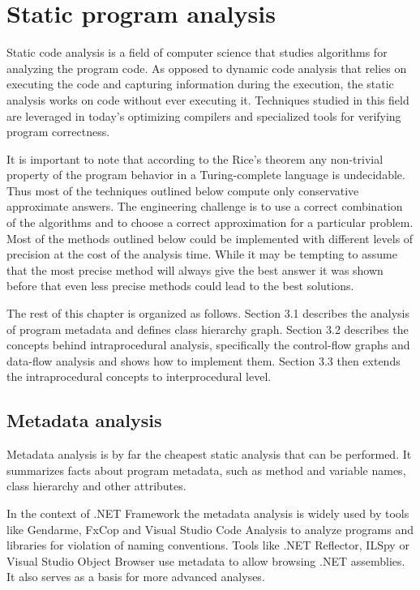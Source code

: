 \chapter{Static program analysis}

Static code analysis is a field of computer science that studies algorithms for analyzing the program code. As opposed to dynamic code analysis that relies on executing the code and capturing information during the execution, the static analysis works on code without ever executing it. Techniques studied in this field are leveraged in today's optimizing compilers and specialized tools for verifying program correctness.

It is important to note that according to the Rice's theorem \citep{Rice1953} any non-trivial property of the program behavior in a Turing-complete language is undecidable. Thus most of the techniques outlined below compute only conservative approximate answers. The engineering challenge is to use a correct combination of the algorithms and to choose a correct approximation for a particular problem. Most of the methods outlined below could be implemented with different levels of precision at the cost of the analysis time. While it may be tempting to assume that the most precise method will always give the best answer it was shown before \citep{Milanova2002} that even less precise methods could lead to the best solutions.

The rest of this chapter is organized as follows. Section 3.1 describes the analysis of program metadata and defines class hierarchy graph. Section 3.2 describes the concepts behind intraprocedural analysis, specifically the control-flow graphs and data-flow analysis and shows how to implement them. Section 3.3 then extends the intraprocedural concepts to interprocedural level.

\section{Metadata analysis}

Metadata analysis is by far the cheapest static analysis that can be performed. It summarizes facts about program metadata, such as method and variable names, class hierarchy and other attributes.

In the context of .NET Framework the metadata analysis is widely used by tools like Gendarme, FxCop and Visual Studio Code Analysis to analyze programs and libraries for violation of naming conventions. Tools like .NET Reflector, ILSpy \citep{ILSpy} or Visual Studio Object Browser use metadata to allow browsing .NET assemblies. It also serves as a basis for more advanced analyses.

